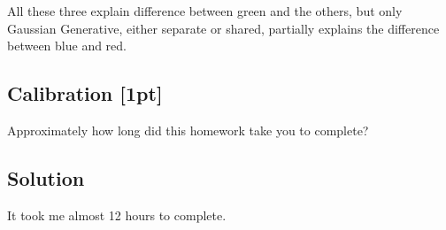 \documentclass[submit]{harvardml}
\begin{document}
All these three explain difference between green and the others, but only Gaussian Generative, either separate or shared, partially explains the difference between blue and red.

\newpage
\subsection*{Calibration [1pt]}
Approximately how long did this homework take you to complete?

\subsection*{Solution}
It took me almost 12 hours to complete.
\end{document}
